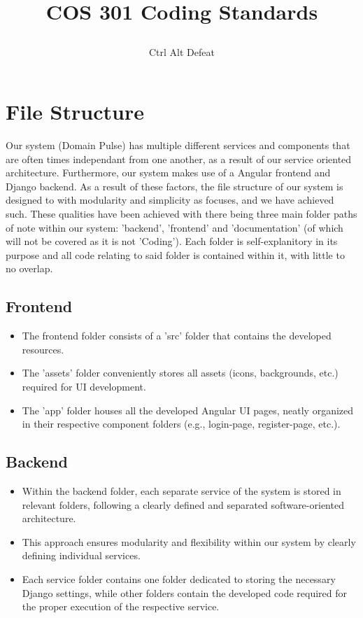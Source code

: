 \documentclass[12pt]{article}
\title{

\\
{COS 301 Coding Standards}
}
\author{Ctrl Alt Defeat}
\begin{document}


\tableofcontents

\newpage


\section{File Structure}
Our system (Domain Pulse) has multiple different services and components that are often times independant from one another, as a result of our service oriented architecture. Furthermore, our system makes use of a Angular frontend and Django backend. As a result of these factors, the file structure of our system is designed to with modularity and simplicity as focuses, and we have achieved such. These qualities have been achieved with there being three main folder paths of note within our system: 'backend', 'frontend' and 'documentation' (of which will not be covered as it is not 'Coding'). Each folder is self-explanitory in its purpose and all code relating to said folder is contained within it, with little to no overlap.

\subsection{Frontend}
\begin{itemize}
    \item The frontend folder consists of a 'src' folder that contains the developed resources.
    \item The 'assets' folder conveniently stores all assets (icons, backgrounds, etc.) required for UI development.
    \item The 'app' folder houses all the developed Angular UI pages, neatly organized in their respective component folders (e.g., login-page, register-page, etc.).
\end{itemize}
\subsection{Backend}
\begin{itemize}
    \item Within the backend folder, each separate service of the system is stored in relevant folders, following a clearly defined and separated software-oriented architecture.
    \item This approach ensures modularity and flexibility within our system by clearly defining individual services.
    \item Each service folder contains one folder dedicated to storing the necessary Django settings, while other folders contain the developed code required for the proper execution of the respective service.
\end{itemize}
\end{document}
